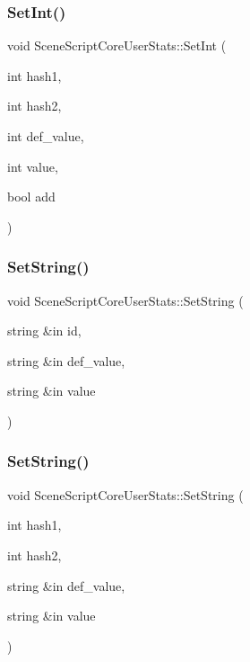 \subsubsection{\texorpdfstring{Set\+Int()}{SetInt()}\hspace{0.1cm}{\footnotesize\ttfamily [2/2]}}
{\footnotesize\ttfamily void Scene\+Script\+Core\+User\+Stats\+::\+Set\+Int (\begin{DoxyParamCaption}\item[{int}]{hash1,  }\item[{int}]{hash2,  }\item[{int}]{def\+\_\+value,  }\item[{int}]{value,  }\item[{bool}]{add }\end{DoxyParamCaption})}

\hypertarget{class_scene_script_core_user_stats_a897e16d2aa8d959d6c2e5c78c628a3c1}{}\label{class_scene_script_core_user_stats_a897e16d2aa8d959d6c2e5c78c628a3c1} 
\subsubsection{\texorpdfstring{Set\+String()}{SetString()}\hspace{0.1cm}{\footnotesize\ttfamily [1/2]}}
{\footnotesize\ttfamily void Scene\+Script\+Core\+User\+Stats\+::\+Set\+String (\begin{DoxyParamCaption}\item[{string \&in}]{id,  }\item[{string \&in}]{def\+\_\+value,  }\item[{string \&in}]{value }\end{DoxyParamCaption})}

\hypertarget{class_scene_script_core_user_stats_a7b67627067c5468f10d5ff30ea72885d}{}\label{class_scene_script_core_user_stats_a7b67627067c5468f10d5ff30ea72885d} 
\subsubsection{\texorpdfstring{Set\+String()}{SetString()}\hspace{0.1cm}{\footnotesize\ttfamily [2/2]}}
{\footnotesize\ttfamily void Scene\+Script\+Core\+User\+Stats\+::\+Set\+String (\begin{DoxyParamCaption}\item[{int}]{hash1,  }\item[{int}]{hash2,  }\item[{string \&in}]{def\+\_\+value,  }\item[{string \&in}]{value }\end{DoxyParamCaption})}

